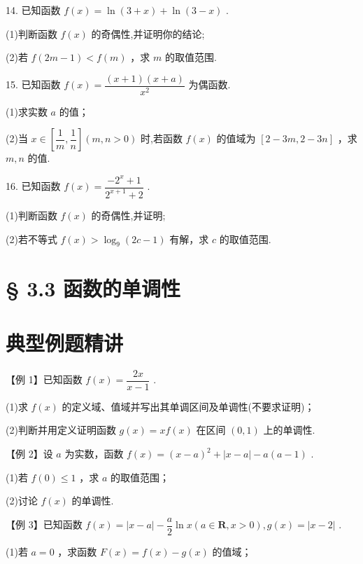 14. 已知函数 $f\left( x\right)  = \ln \left( {3 + x}\right)  + \ln \left( {3 - x}\right)$ .

(1)判断函数 $f\left( x\right)$ 的奇偶性,并证明你的结论;

(2)若 $f\left( {{2m} - 1}\right)  < f\left( m\right)$ ，求 $m$ 的取值范围.

15. 已知函数 $f\left( x\right)  = \dfrac{\left( {x + 1}\right) \left( {x + a}\right) }{{x}^{2}}$ 为偶函数.

(1)求实数 $a$ 的值；

(2)当 $x \in  \left\lbrack  {\dfrac{1}{m},\dfrac{1}{n}}\right\rbrack  \left( {m,n > 0}\right)$ 时,若函数 $f\left( x\right)$ 的值域为 $\left\lbrack  {2 - {3m},2 - {3n}}\right\rbrack$ ，求 $m,n$ 的值.

16. 已知函数 $f\left( x\right)  = \dfrac{-{2}^{x} + 1}{{2}^{x + 1} + 2}$ .

(1)判断函数 $f\left( x\right)$ 的奇偶性,并证明;

(2)若不等式 $f\left( x\right)  > {\log }_{9}\left( {{2c} - 1}\right)$ 有解，求 $c$ 的取值范围.

\section*{§ 3.3 函数的单调性}

\section*{典型例题精讲}

【例 1】已知函数 $f\left( x\right)  = \dfrac{2x}{x - 1}$ .

(1)求 $f\left( x\right)$ 的定义域、值域并写出其单调区间及单调性(不要求证明)；

(2)判断并用定义证明函数 $g\left( x\right)  = {xf}\left( x\right)$ 在区间 $\left( {0,1}\right)$ 上的单调性.

【例 2】设 $a$ 为实数，函数 $f\left( x\right)  = {\left( x - a\right) }^{2} + \left| {x - a}\right|  - a\left( {a - 1}\right)$ .

(1)若 $f\left( 0\right)  \leq  1$ ，求 $a$ 的取值范围；

(2)讨论 $f\left( x\right)$ 的单调性.

【例 3】已知函数 $f\left( x\right)  = \left| {x - a}\right|  - \dfrac{a}{2}\ln x\left( {a \in  \mathbf{R},x > 0}\right) ,g\left( x\right)  = \left| {x - 2}\right|$ .

(1)若 $a = 0$ ，求函数 $F\left( x\right)  = f\left( x\right)  - g\left( x\right)$ 的值域；

